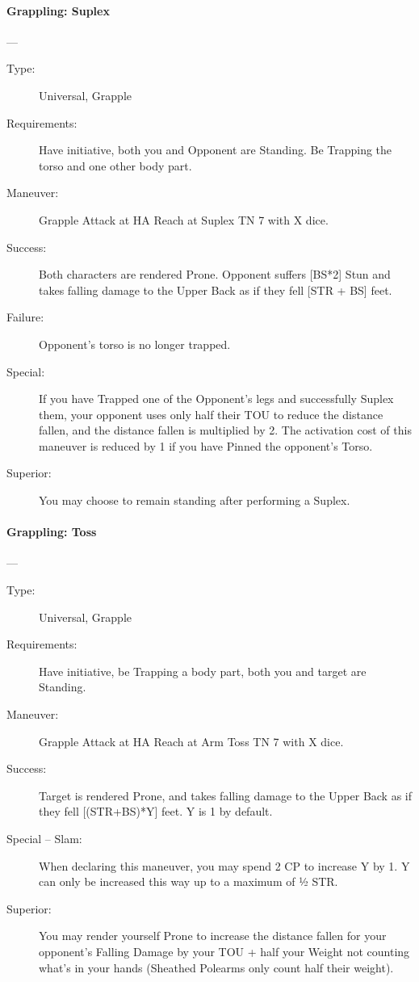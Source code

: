 \paragraph{Grappling: Suplex \large} \label{man:grappling-suplex}
---\quad {\large [X+3]}
\vspace{-10pt} \begin{description}
\item [Type:] Universal, Grapple
\item [Requirements:]Have initiative, both you and Opponent are Standing. Be
  Trapping 
the torso and one other body part. 
\item [Maneuver:] Grapple Attack at HA Reach at Suplex TN 7 with X dice.
\item [Success:] Both characters are rendered Prone. Opponent suffers [BS*2]
  Stun and 
takes falling damage to the Upper Back as if they fell [STR + BS] feet. 
\item [Failure:] Opponent’s torso is no longer trapped.
\item [Special:] If you have Trapped one of the Opponent's legs and successfully
  Suplex them, your opponent uses only half their TOU to reduce the distance
  fallen, and the distance fallen is multiplied by 2. The activation cost of
  this maneuver is reduced by 1 if you have Pinned the opponent’s Torso. 
\item [ Superior: ] You may choose to remain standing after performing a Suplex.
\end{description}

\paragraph{Grappling: Toss \large} \label{man:grappling-toss}
---\quad {\large [X+2]}
\vspace{-10pt} \begin{description}
\item [Type:] Universal, Grapple
\item [Requirements:] Have initiative, be Trapping a body part, both you and
  target are Standing. 
\item [Maneuver:] Grapple Attack at HA Reach at Arm Toss TN 7 with X dice.
\item [Success:] Target is rendered Prone, and takes falling damage to the Upper
  Back as if they fell [(STR+BS)*Y] feet.  
 Y is 1 by default.
\item [Special -- Slam:]
 When declaring this maneuver, you may spend 2 CP to increase Y by 1. Y can only
 be increased this way up to a maximum of 1⁄2 STR.
 \item [Superior:] You may render yourself Prone to increase the distance fallen
   for your opponent’s Falling Damage by your TOU + half your Weight not
   counting what's in your hands (Sheathed Polearms only count half their
   weight).    
\end{description}

